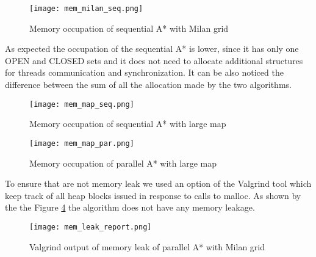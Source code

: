 \begin{figure}
    \centering
    \texttt{[image: mem\_milan\_seq.png]}
    \caption{Memory occupation of sequential A* with Milan grid}
    \label{mem-seq-milan}
\end{figure}

As expected the occupation of the sequential A* is lower, since it has only one OPEN and CLOSED sets and it does not need to allocate additional structures for threads communication and synchronization.
It can be also noticed the difference between the sum of all the allocation made by the two algorithms.



\begin{figure}
    \centering
    \texttt{[image: mem\_map\_seq.png]}
    \caption{Memory occupation of sequential A* with large map}
    \label{mem-seq-map}
\end{figure}

\begin{figure}
    \centering
    \texttt{[image: mem\_map\_par.png]}
    \caption{Memory occupation of parallel A* with large map}
    \label{mem-par-map}
\end{figure}


To ensure that are not memory leak we used an option of the Valgrind tool which keep track of all heap blocks issued in response to calls to malloc.
As shown by the the Figure \ref{mem-leak-milan} the algorithm does not have any memory leakage.

\begin{figure}
    \centering
    \texttt{[image: mem\_leak\_report.png]}
    \caption{Valgrind output of memory leak of parallel A* with Milan grid}
    \label{mem-leak-milan}
\end{figure}


